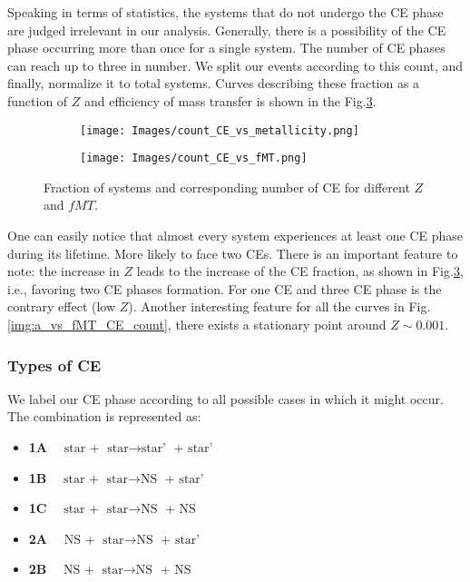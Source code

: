 \documentclass[preprint,12pt]{elsarticle}
\begin{document}
Speaking in terms of statistics, the systems that do not undergo the CE phase are judged irrelevant in our analysis. Generally, there is a possibility of the CE phase occurring more than once for a single system. The number of CE phases can reach up to three in number. We split our events according to this count, and finally, normalize it to total systems. Curves describing these fraction as a function of $Z$ and efficiency of mass transfer is shown in the Fig.\ref{img:count_CE_fraction}. 

\begin{figure}[ht]
    \begin{subfigure}[t]{1\textwidth}
      \centering
       \texttt{[image: Images/count\_CE\_vs\_metallicity.png]}
       \caption{}
       \label{img:count_CE_vs_Z}
    \end{subfigure}
    \begin{subfigure}[t]{1\textwidth}
      \centering
      \texttt{[image: Images/count\_CE\_vs\_fMT.png]}
      \label{img:CE_count_vs_fMT}
      \caption{}
    \end{subfigure} 
    \caption{Fraction of systems and corresponding number of CE for different $Z$ and $fMT$.}
    \label{img:count_CE_fraction}
\end{figure}

One can easily notice that almost every system experiences at least one CE phase during its lifetime. More likely to face two CEs. There is an important feature to note: the increase in $Z$ leads to the increase of the CE fraction, as shown in Fig.\ref{img:count_CE_fraction}, i.e., favoring two CE phases formation. For one CE and three CE phase is the contrary effect (low $Z$). Another interesting feature for all the curves in Fig.\ref{img:a_vs_fMT_CE_count}, there exists a stationary point around $ Z \sim 0.001$.\\

\subsubsection{\textbf{Types of CE}}
\label{sec:type_CE}

We label our CE phase according to all possible cases in which it might occur. The combination is represented as:
\begin{itemize}
    \item \textbf{1A} $\quad \text{star}$ + $\text{star} \rightarrow  \text{star'}$ + $\text{star'}$
    \item \textbf{1B} $\quad \text{star}$ + $\text{star} \rightarrow  \text{NS}$ + $\text{star'}$
    \item \textbf{1C} $\quad \text{star}$ + $\text{star} \rightarrow  \text{NS}$ + $\text{NS}$
    \item \textbf{2A} $\quad \text{NS}$ + $\text{star} \rightarrow  \text{NS}$ + $\text{star'}$
    \item \textbf{2B} $\quad \text{NS}$ + $\text{star} \rightarrow  \text{NS}$ + $\text{NS}$
\end{itemize}
\\
\end{document}
